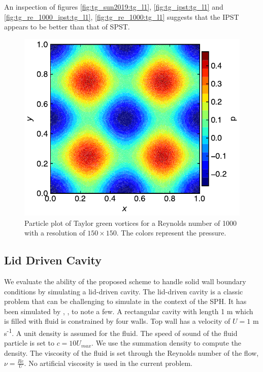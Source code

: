 An inspection of figures \ref{fig:tg_sun2019:tg_l1}, \ref{fig:tg_ipst:tg_l1}
and \ref{fig:tg_re_1000_ipst:tg_l1}, \ref{fig:tg_re_1000:tg_l1} suggests that the
IPST  appears to be better than that of SPST.

\begin{figure}
  \centering
  \includegraphics[width=0.5\linewidth]{figures/ctvf/figures/taylor_green_re_1000/tg_pplot_p_re_1000}
  \caption{Particle plot of Taylor green vortices for a Reynolds number of
    1000 with a resolution of $150\times150$. The colors represent the
    pressure.}%
  \label{fig:tg_re_1000:pplot}
\end{figure}
%


\FloatBarrier%
\subsection{Lid Driven Cavity}
\label{sec:ldc}

We evaluate the ability of the proposed scheme to handle solid wall boundary
conditions by simulating a lid-driven cavity. The lid-driven cavity is a
classic problem that can be challenging to simulate in the context of the SPH.
It has been simulated by \citep{Adami2013}, \citep{huang_kernel_2019},
\citep{edac-sph:cf:2019} to note a few. A rectangular cavity with length 1 m
which is filled with fluid is constrained by four walls. Top wall has a
velocity of $U = 1 $ m\,s\textsuperscript{-1}. A unit density is assumed for the
fluid. The speed of sound of the fluid particle is set to $c = 10 U_{max}$. We
use the summation density to compute the density. The viscosity of the fluid
is set through the Reynolds number of the flow, $\nu = \frac{Re}{U}$. No
artificial viscosity is used in the current problem.

